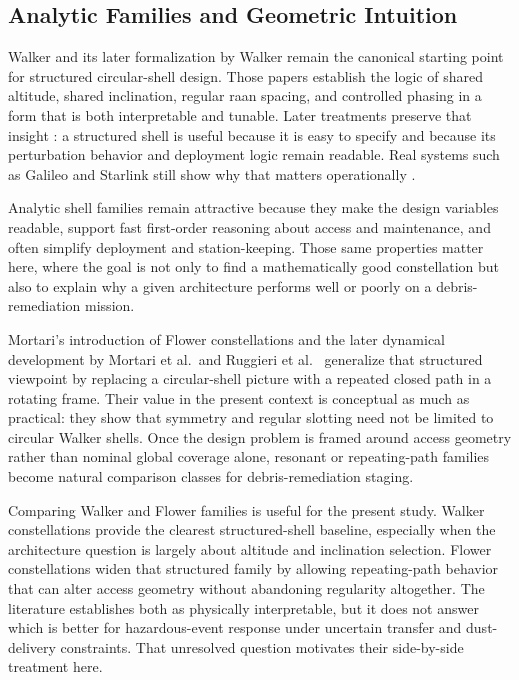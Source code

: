 \subsection{Analytic Families and Geometric Intuition}
Walker \cite{walker1970} and its later formalization by Walker \cite{walker1984} remain the canonical starting point for structured circular-shell design. Those papers establish the logic of shared altitude, shared inclination, regular \gls{raan} spacing, and controlled phasing in a form that is both interpretable and tunable. Later treatments preserve that insight \cite{lang1998comp}: a structured shell is useful because it is easy to specify and because its perturbation behavior and deployment logic remain readable. Real systems such as Galileo and Starlink still show why that matters operationally \cite{GalileoSISICD2025,fcc2018starlinkmod}.

Analytic shell families remain attractive because they make the design variables readable, support fast first-order reasoning about access and maintenance, and often simplify deployment and station-keeping. Those same properties matter here, where the goal is not only to find a mathematically good constellation but also to explain why a given architecture performs well or poorly on a debris-remediation mission.

Mortari's introduction of Flower constellations \cite{mortari2004} and the later dynamical development by Mortari et al.\ and Ruggieri et al.\ \cite{mortari2006acta,ruggieri2006flower} generalize that structured viewpoint by replacing a circular-shell picture with a repeated closed path in a rotating frame. Their value in the present context is conceptual as much as practical: they show that symmetry and regular slotting need not be limited to circular Walker shells. Once the design problem is framed around access geometry rather than nominal global coverage alone, resonant or repeating-path families become natural comparison classes for debris-remediation staging.

Comparing Walker and Flower families is useful for the present study. Walker constellations provide the clearest structured-shell baseline, especially when the architecture question is largely about altitude and inclination selection. Flower constellations widen that structured family by allowing repeating-path behavior that can alter access geometry without abandoning regularity altogether. The literature establishes both as physically interpretable, but it does not answer which is better for hazardous-event response under uncertain transfer and dust-delivery constraints. That unresolved question motivates their side-by-side treatment here.

